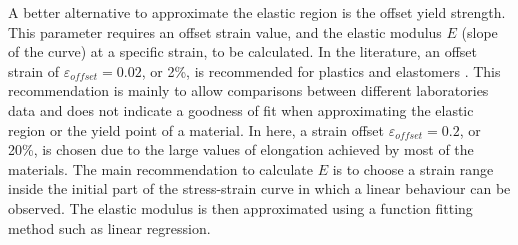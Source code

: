 A better alternative to approximate the elastic region is the offset yield strength. This parameter requires an offset strain value, and the elastic modulus $E$ (slope of the curve) at a specific strain, to be calculated. In the literature, an offset strain of $\varepsilon_{offset}=0.02$, or 2\%, is recommended for plastics and elastomers \cite{instron2019}. This recommendation is mainly to allow comparisons between different laboratories data and does not indicate a goodness of fit when approximating the elastic region or the yield point of a material. In here, a strain offset $\varepsilon_{offset}=0.2$, or 20\%, is chosen due to the large values of elongation achieved by most of the materials. The main recommendation to calculate $E$ is to choose a strain range inside the initial part of the stress-strain curve in which a linear behaviour can be observed. The elastic modulus is then approximated using a function fitting method such as linear regression.

